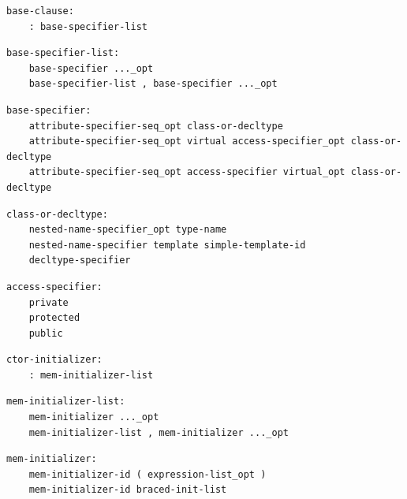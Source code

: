 \noindent\textbf{\texttt{}}\par
\begin{lstlisting}
base-clause:
    : base-specifier-list
\end{lstlisting}

\noindent\textbf{\texttt{}}\par
\begin{lstlisting}
base-specifier-list:
    base-specifier ..._opt
    base-specifier-list , base-specifier ..._opt
\end{lstlisting}

\noindent\textbf{\texttt{}}\par
\begin{lstlisting}
base-specifier:
    attribute-specifier-seq_opt class-or-decltype
    attribute-specifier-seq_opt virtual access-specifier_opt class-or-decltype
    attribute-specifier-seq_opt access-specifier virtual_opt class-or-decltype
\end{lstlisting}

\noindent\textbf{\texttt{}}\par
\begin{lstlisting}
class-or-decltype:
    nested-name-specifier_opt type-name
    nested-name-specifier template simple-template-id
    decltype-specifier
\end{lstlisting}

\noindent\textbf{\texttt{}}\par
\begin{lstlisting}
access-specifier:
    private
    protected
    public
\end{lstlisting}

\noindent\textbf{\texttt{}}\par
\begin{lstlisting}
ctor-initializer:
    : mem-initializer-list
\end{lstlisting}

\noindent\textbf{\texttt{}}\par
\begin{lstlisting}
mem-initializer-list:
    mem-initializer ..._opt
    mem-initializer-list , mem-initializer ..._opt
\end{lstlisting}

\noindent\textbf{\texttt{}}\par
\begin{lstlisting}
mem-initializer:
    mem-initializer-id ( expression-list_opt )
    mem-initializer-id braced-init-list
\end{lstlisting}

